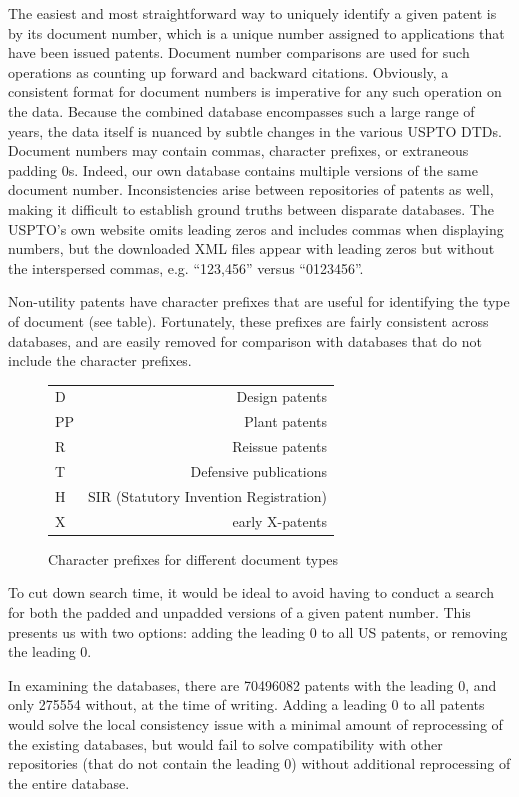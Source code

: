 \documentclass[11pt]{article}
\begin{document}
The easiest and most straightforward way to uniquely identify a given patent is
by its document number, which is a unique number assigned to applications that
have been issued patents. Document number comparisons are used for such
operations as counting up forward and backward citations. Obviously, a
consistent format for document numbers is imperative for any such operation on
the data. Because the combined database encompasses such a large range of
years, the data itself is nuanced by subtle changes in the various USPTO DTDs.
Document numbers may contain commas, character prefixes, or extraneous padding
0s. Indeed, our own database contains multiple versions of the same document
number. Inconsistencies arise between repositories of patents as well, making
it difficult to establish ground truths between disparate databases. The
USPTO's own website omits leading zeros and includes commas when displaying
numbers, but the downloaded XML files appear with leading zeros but without the
interspersed commas, e.g. ``123,456'' versus ``0123456''.

Non-utility patents have character prefixes that are useful for identifying the
type of document (see table). Fortunately, these prefixes are fairly consistent
across databases, and are easily removed for comparison with databases that do
not include the character prefixes.

\begin{figure}
  \begin{center}
\begin{tabular}{|l|r|}
  \hline
  D & Design patents \\
  PP & Plant patents \\
  R & Reissue patents \\
  T & Defensive publications \\
  H & SIR (Statutory Invention Registration) \\
  X & early X-patents \\
  \hline
\end{tabular}
\end{center}
\caption{Character prefixes for different document types ~\cite{patentprefixes}}
\end{figure}

To cut down search time, it would be ideal to avoid having to conduct a search
for both the padded and unpadded versions of a given patent number. This
presents us with two options: adding the leading 0 to all US patents, or
removing the leading 0.

In examining the databases, there are 70496082 patents with the leading 0, and
only 275554 without, at the time of writing. Adding a leading 0 to all patents
would solve the local consistency issue with a minimal amount of reprocessing
of the existing databases, but would fail to solve compatibility with other
repositories (that do not contain the leading 0) without additional
reprocessing of the entire database.
\end{document}
